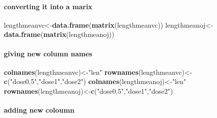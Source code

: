 \documentclass[]{article}
\newenvironment{Shaded}{\begin{snugshade}}{\end{snugshade}}
\newcommand{\KeywordTok}[1]{\textcolor[rgb]{0.13,0.29,0.53}{\textbf{#1}}}
\newcommand{\DecValTok}[1]{\textcolor[rgb]{0.00,0.00,0.81}{#1}}
\newcommand{\FloatTok}[1]{\textcolor[rgb]{0.00,0.00,0.81}{#1}}
\newcommand{\StringTok}[1]{\textcolor[rgb]{0.31,0.60,0.02}{#1}}
\newcommand{\OperatorTok}[1]{\textcolor[rgb]{0.81,0.36,0.00}{\textbf{#1}}}
\newcommand{\NormalTok}[1]{#1}
\let\oldparagraph\paragraph
\renewcommand{\paragraph}[1]{\oldparagraph{#1}\mbox{}}
\begin{document}
\paragraph{converting it into a marix}\label{converting-it-into-a-marix}

\begin{Shaded}
\begin{Highlighting}[]
\NormalTok{lengthmeanvc<-}\KeywordTok{data.frame}\NormalTok{(}\KeywordTok{matrix}\NormalTok{(lengthmeanvc))}
\NormalTok{lengthmeanoj<-}\KeywordTok{data.frame}\NormalTok{(}\KeywordTok{matrix}\NormalTok{(lengthmeanoj))}
\end{Highlighting}
\end{Shaded}

\paragraph{giving new column names}\label{giving-new-column-names}

\begin{Shaded}
\begin{Highlighting}[]
\KeywordTok{colnames}\NormalTok{(lengthmeanvc)<-}\StringTok{"len"}
\KeywordTok{rownames}\NormalTok{(lengthmeanvc)<-}\KeywordTok{c}\NormalTok{(}\StringTok{"dose0.5"}\NormalTok{,}\StringTok{"dose1"}\NormalTok{,}\StringTok{"dose2"}\NormalTok{)}
\KeywordTok{colnames}\NormalTok{(lengthmeanoj)<-}\StringTok{"len"}
\KeywordTok{rownames}\NormalTok{(lengthmeanoj)<-}\KeywordTok{c}\NormalTok{(}\StringTok{"dose0.5"}\NormalTok{,}\StringTok{"dose1"}\NormalTok{,}\StringTok{"dose2"}\NormalTok{)}
\end{Highlighting}
\end{Shaded}

\paragraph{adding new coloumn}\label{adding-new-coloumn}

\begin{Shaded}
\end{Shaded}
\end{document}
